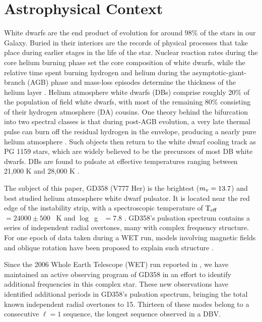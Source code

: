 \documentclass[12pt,preprint]{aastex}
\newcommand{\teff}{$\rm T_{eff}$}
\newcommand{\logg}{$\log$\ g }
\begin{document}
\section{Astrophysical Context}
\label{intro}
White dwarfs are the end product of evolution for around 98\% of the stars in our Galaxy. 
Buried in their interiors are the records of physical processes that take place during 
earlier stages in the life of the star. Nuclear reaction rates during the core helium 
burning phase set the core composition of white dwarfs, while the relative time spent 
burning hydrogen and helium during the asymptotic-giant-branch (AGB) phase and mass-loss 
episodes determine the thickness of the helium layer \citep{Lawlor06,Althaus05}. Helium 
atmosphere white dwarfs (DBs) comprise roughly 20\% of the population of field white 
dwarfs, with most of the remaining 80\% consisting of their hydrogen atmosphere (DA) 
cousins. One theory behind the bifurcation into two spectral classes is that during post-AGB evolution, 
a very late thermal pulse can burn off the residual hydrogen 
in the envelope, producing a nearly pure helium atmosphere \citep{Iben83}. Such objects 
then return to the white dwarf cooling track as PG 1159 stars, which are 
widely believed to be the precursors of most DB white dwarfs. DBs are found to pulsate at 
effective temperatures ranging between 21,000 K and 28,000 K \citep{Beauchamp99, Castanheira05}. 

The subject of this paper, GD358 (V777 Her) is the brightest ($m_{\rm v}=13.7$) and best 
studied helium atmosphere white dwarf pulsator. It is located near the red edge of the 
instability strip, with a spectroscopic temperature of \teff\ $=24000\pm500$ ~K and \logg\ $=7.8$ 
\citep{Nitta12, Koester2013}. GD358's pulsation spectrum contains a series of independent 
radial overtones, many with complex frequency structure.  For one epoch of data taken during a WET run, 
models involving magnetic fields and oblique rotation have been proposed to explain such structure \citep{Montgomery10}.

Since the 2006 Whole Earth Telescope (WET) run reported in \citet{Provencal09}, 
we have maintained an active observing program of GD358 in an effort to identify additional
frequencies in this complex star. These new observations have identified additional 
periods in GD358's pulsation spectrum, bringing the total known independent radial overtones to 15. Thirteen of 
these modes belong to a consecutive $\ell=1$ sequence, the longest sequence observed 
in a DBV. 
\end{document}
